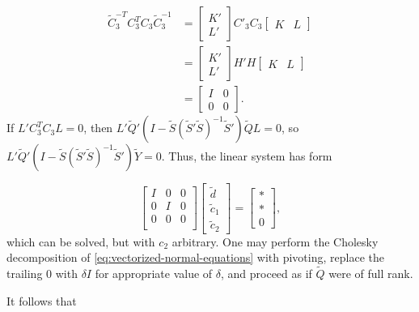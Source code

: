 \documentclass[12pt]{article}
\newcommand{\tildeY}{\tilde{Y}}
\newcommand{\tildeQ}{\tilde{Q}}
\newcommand{\tildeS}{\tilde{S}}
\theoremstyle{definition}
\begin{document}
\begin{align*}
\tilde{C}_3^{-T} C_3^{T} C_3 \tilde{C}_3^{-1} &= \begin{bmatrix} K' \\ L' \end{bmatrix} C'_3C_3 \begin{bmatrix} K &  L\end{bmatrix} \\
&= \begin{bmatrix} K' \\ L' \end{bmatrix} H'H \begin{bmatrix} K &  L\end{bmatrix} \\
&= \begin{bmatrix} I & 0 \\ 0 & 0 \end{bmatrix}.
\end{align*}
\noindent
If $L'C_3^{T} C_3 L = 0$, then $L'\tildeQ'\left( I - \tildeS\left( \tildeS' \tildeS \right)^{-1} \tildeS' \right)\tildeQ L = 0$, so $L'\tildeQ'\left( I - \tildeS\left( \tildeS' \tildeS \right)^{-1} \tildeS' \right) \tildeY = 0$. Thus, the linear system has form

\begin{equation} \label{eq:vectorized-normal-equations-cholesky-2}
\begin{bmatrix}
I & 0 & 0\\
0 & I & 0 \\
0 & 0 & 0 \\
\end{bmatrix}
\begin{bmatrix}
\tilde{d}\\
\tilde{c}_1\\
\tilde{c}_2
\end{bmatrix}
= \begin{bmatrix}
* \\
* \\
0
\end{bmatrix},
\end{equation}
\noindent
which can be solved, but with $c_2$ arbitrary. One may perform the Cholesky decomposition of \ref{eq:vectorized-normal-equations} with pivoting, replace the trailing $0$ with $\delta I$ for appropriate value of $\delta$, and proceed as if $\tildeQ$ were of full rank. 
\bigskip

It follows that
\end{document}
